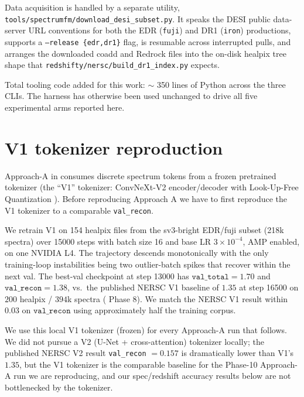 \documentclass[11pt,letterpaper]{article}
\begin{document}
Data acquisition is handled by a separate utility,
\texttt{tools/spectrumfm/download\_desi\_subset.py}. It speaks the
DESI public data-server URL conventions for both the EDR (\texttt{fuji})
and DR1 (\texttt{iron}) productions, supports a
\texttt{--release \{edr,dr1\}} flag, is resumable across interrupted
pulls, and arranges the downloaded coadd and Redrock files into the
on-disk healpix tree shape that
\texttt{redshifty/nersc/build\_dr1\_index.py} expects.

Total tooling code added for this work: $\sim$ 350 lines of Python
across the three CLIs. The harness has otherwise been used unchanged
to drive all five experimental arms reported here.

\section{V1 tokenizer reproduction}

Approach-A in \citet{samuel2026redshifty} consumes discrete spectrum
tokens from a frozen pretrained tokenizer (the ``V1'' tokenizer:
ConvNeXt-V2 encoder/decoder \autocite{convnextv2} with Look-Up-Free
Quantization \autocite{yu2023lfq}). Before reproducing Approach A we
have to first reproduce the V1 tokenizer to a comparable
\texttt{val\_recon}.

We retrain V1 on 154 healpix files from the sv3-bright EDR/fuji subset
(218k spectra) over 15000 steps with batch size 16 and base LR
$3{\times}10^{-4}$, AMP enabled, on one NVIDIA L4. The trajectory
descends monotonically with the only training-loop instabilities being
two outlier-batch spikes that recover within the next val. The
best-val checkpoint at step 13000 has $\texttt{val\_total} = 1.70$ and
$\texttt{val\_recon} = 1.38$, vs.\ the published NERSC V1 baseline of
$1.35$ at step 16500 on $200$ healpix / $394$k spectra
(\citealt{samuel2026redshifty} Phase 8). We match the NERSC V1 result
within $0.03$ on $\texttt{val\_recon}$ using approximately half the
training corpus.

We use this local V1 tokenizer (frozen) for every Approach-A run that
follows. We did not pursue a V2 (U-Net + cross-attention) tokenizer
locally; the published NERSC V2 result \texttt{val\_recon} $= 0.157$
\autocite{samuel2026redshifty} is dramatically lower than V1's $1.35$,
but the V1 tokenizer is the comparable baseline for the Phase-10
Approach-A run we are reproducing, and our spec/redshift accuracy
results below are not bottlenecked by the tokenizer.
\end{document}
